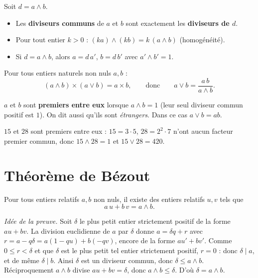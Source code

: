 \begin{propriete}
Soit $d=a\wedge b$.
\begin{itemize}
\item Les \textbf{diviseurs communs} de $a$ et $b$ sont exactement les \textbf{diviseurs de $d$}.
\item Pour tout entier $k>0$ : $(ka)\wedge(kb)=k\,(a\wedge b)$ (homogénéité).
\item Si $d=a\wedge b$, alors $a=d\,a'$, $b=d\,b'$ avec $a'\wedge b'=1$.
\end{itemize}
\end{propriete}

\begin{propriete}
Pour tous entiers naturels non nuls $a,b$ :
\[
(a\wedge b)\times(a\vee b)=a\times b,\qquad\text{donc}\qquad a\vee b=\frac{a\,b}{a\wedge b}.
\]
\end{propriete}

\begin{definition}
$a$ et $b$ sont \textbf{premiers entre eux} lorsque $a\wedge b=1$ (leur seul diviseur commun
positif est $1$). On dit aussi qu'ils sont \emph{étrangers}. Dans ce cas $a\vee b=ab$.
\end{definition}

\begin{exemple}
$15$ et $28$ sont premiers entre eux : $15=3\cdot5$, $28=2^2\cdot7$ n'ont aucun facteur
premier commun, donc $15\wedge28=1$ et $15\vee28=420$.
\end{exemple}

\section{Théorème de Bézout}

\begin{theoreme}
Pour tous entiers relatifs $a,b$ non nuls, il existe des entiers relatifs $u,v$ tels que
\[
a\,u+b\,v=a\wedge b.
\]
\end{theoreme}

\begin{remarque}
\textit{Idée de la preuve.} Soit $\delta$ le plus petit entier strictement positif de la forme
$au+bv$. La division euclidienne de $a$ par $\delta$ donne $a=\delta q+r$ avec
$r=a-q\delta=a(1-qu)+b(-qv)$, encore de la forme $au'+bv'$. Comme $0\le r<\delta$ et que
$\delta$ est le plus petit tel entier strictement positif, $r=0$ : donc $\delta\mid a$, et de
même $\delta\mid b$. Ainsi $\delta$ est un diviseur commun, donc $\delta\le a\wedge b$.
Réciproquement $a\wedge b$ divise $au+bv=\delta$, donc $a\wedge b\le\delta$. D'où
$\delta=a\wedge b$.
\end{remarque}

